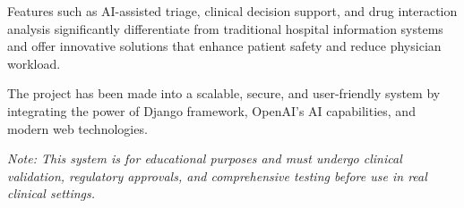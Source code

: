 \documentclass[12pt,a4paper]{article}
\begin{document}
Features such as AI-assisted triage, clinical decision support, and drug interaction analysis significantly differentiate from traditional hospital information systems and offer innovative solutions that enhance patient safety and reduce physician workload.

The project has been made into a scalable, secure, and user-friendly system by integrating the power of Django framework, OpenAI's AI capabilities, and modern web technologies.

\vspace{1cm}

\textit{Note: This system is for educational purposes and must undergo clinical validation, regulatory approvals, and comprehensive testing before use in real clinical settings.}
\end{document}

